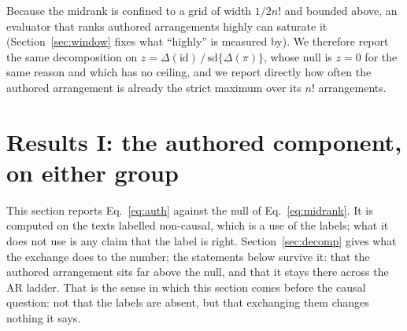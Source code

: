 \documentclass[11pt]{article}
\begin{document}
Because the midrank is confined to a grid of width $1/2n!$ and bounded above,
an evaluator that ranks authored arrangements highly can saturate it
(Section~\ref{sec:window} fixes what ``highly'' is measured by).  We therefore report the same decomposition
on $z = \Delta(\mathrm{id})\,/\,\mathrm{sd}\{\Delta(\pi)\}$, whose null is
$z = 0$ for the same reason and which has no ceiling, and we report directly
how often the authored arrangement is already the strict maximum over its
$n!$ arrangements.

\section{Results I: the authored component, on either group}
\label{sec:authored}

This section reports Eq.~\eqref{eq:auth} against the null of
Eq.~\eqref{eq:midrank}.  It is computed on the texts labelled non-causal,
which is a use of the labels; what it does not use is any claim that the
label is right.  Section~\ref{sec:decomp} gives what the exchange does to
the number; the statements below survive it: that the authored arrangement sits far above the
null, and that it stays there across the AR ladder.  That is the sense in which this section comes
before the causal question: not that the labels are absent, but that
exchanging them changes nothing it says.
\end{document}
